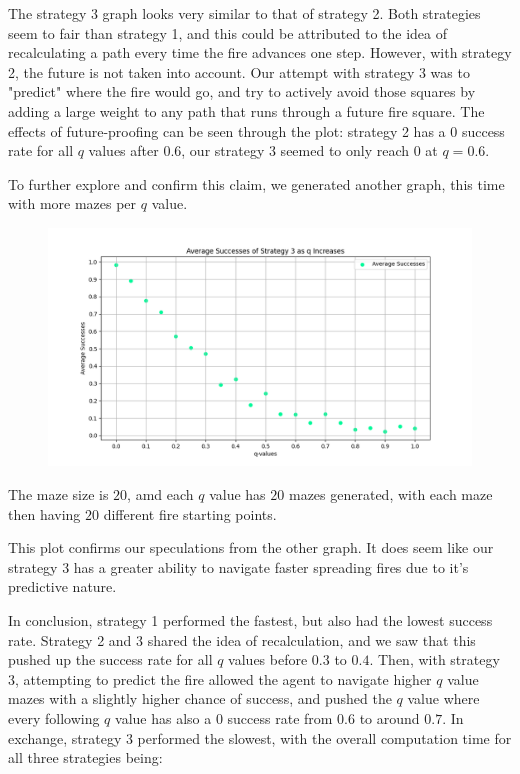 \documentclass[12pt, twoside]{article}
\begin{document}
\begin{enumerate}
        The strategy 3 graph looks very similar to that of strategy 2. Both strategies seem to fair than strategy 1, and this could be attributed to the idea of recalculating a path every time the fire advances one step. However, with strategy 2, the future is not taken into account. Our attempt with strategy 3 was to "predict" where the fire would go, and try to actively avoid those squares by adding a large weight to any path that runs through a future fire square. The effects of future-proofing can be seen through the plot: strategy 2 has a $0$ success rate for all $q$ values after $0.6$, our strategy 3 seemed to only reach $0$ at $q = 0.6$.

        To further explore and confirm this claim, we generated another graph, this time with more mazes per $q$ value.
        
        \vfill
        \pagebreak

        \begin{figure}[h]
            \centering
            \includegraphics[scale = 0.6]{strategy_3_scatter_dim_20.png}
        \end{figure}

        The maze size is $20$, amd each $q$ value has $20$ mazes generated, with each maze then having $20$ different fire starting points.

        This plot confirms our speculations from the other graph. It does seem like our strategy 3 has a greater ability to navigate faster spreading fires due to it's predictive nature.

        \vspace{4mm}
        In conclusion, strategy 1 performed the fastest, but also had the lowest success rate. Strategy 2 and 3 shared the idea of recalculation, and we saw that this pushed up the success rate for all $q$ values before $0.3$ to $0.4$. Then, with strategy 3, attempting to predict the fire allowed the agent to navigate higher $q$ value mazes with a slightly higher chance of success, and pushed the $q$ value where every following $q$ value has also a $0$ success rate from $0.6$ to around $0.7$. In exchange, strategy 3 performed the slowest, with the overall computation time for all three strategies being:


\end{enumerate}
\end{document}
